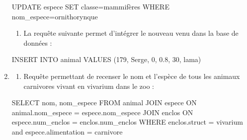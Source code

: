 \documentclass[
  letterpaper,
  DIV=11,
  numbers=noendperiod]{scrartcl}
\newenvironment{Shaded}{\begin{snugshade}}{\end{snugshade}}
\newcommand{\DecValTok}[1]{\textcolor[rgb]{0.68,0.00,0.00}{#1}}
\newcommand{\FloatTok}[1]{\textcolor[rgb]{0.68,0.00,0.00}{#1}}
\newcommand{\KeywordTok}[1]{\textcolor[rgb]{0.00,0.23,0.31}{#1}}
\newcommand{\NormalTok}[1]{\textcolor[rgb]{0.00,0.23,0.31}{#1}}
\newcommand{\OperatorTok}[1]{\textcolor[rgb]{0.37,0.37,0.37}{#1}}
\newcommand{\StringTok}[1]{\textcolor[rgb]{0.13,0.47,0.30}{#1}}
\providecommand{\tightlist}{%
  \setlength{\itemsep}{0pt}\setlength{\parskip}{0pt}}\usepackage{longtable,booktabs,array}
\begin{document}
\begin{enumerate}
\begin{Shaded}
\begin{Highlighting}[]
\KeywordTok{UPDATE}\NormalTok{ espece}
\KeywordTok{SET}\NormalTok{ classe}\OperatorTok{=}\StringTok{\textquotesingle{}mammifères\textquotesingle{}}
\KeywordTok{WHERE}\NormalTok{ nom\_espece}\OperatorTok{=}\StringTok{\textquotesingle{}ornithorynque\textquotesingle{}}
\end{Highlighting}
\end{Shaded}

  \begin{enumerate}
  \def\labelenumii{\alph{enumii}.}
  \setcounter{enumii}{1}
  \tightlist
  \item
    La requête suivante permet d'intégrer le nouveau venu dans la base
    de données :
  \end{enumerate}

\begin{Shaded}
\begin{Highlighting}[]
\KeywordTok{INSERT} \KeywordTok{INTO}\NormalTok{ animal }\KeywordTok{VALUES}\NormalTok{ (}\DecValTok{179}\NormalTok{, }\StringTok{\textquotesingle{}Serge\textquotesingle{}}\NormalTok{, }\DecValTok{0}\NormalTok{, }\FloatTok{0.8}\NormalTok{, }\DecValTok{30}\NormalTok{, }\StringTok{\textquotesingle{}lama\textquotesingle{}}\NormalTok{)}
\end{Highlighting}
\end{Shaded}
\item
  \begin{enumerate}
  \def\labelenumii{\alph{enumii}.}
  \tightlist
  \item
    Requête permettant de recenser le nom et l'espèce de tous les
    animaux carnivores vivant en vivarium dans le zoo :
  \end{enumerate}

\begin{Shaded}
\begin{Highlighting}[]
\KeywordTok{SELECT}\NormalTok{ nom, nom\_espece}
\KeywordTok{FROM}\NormalTok{ animal}
\KeywordTok{JOIN}\NormalTok{ espece }\KeywordTok{ON}\NormalTok{ animal.nom\_espece }\OperatorTok{=}\NormalTok{ espece.nom\_espece}
\KeywordTok{JOIN}\NormalTok{ enclos }\KeywordTok{ON}\NormalTok{ espece.num\_enclos }\OperatorTok{=}\NormalTok{ enclos.num\_enclos}
\KeywordTok{WHERE}\NormalTok{ enclos.struct }\OperatorTok{=} \StringTok{\textquotesingle{}vivarium\textquotesingle{}} \KeywordTok{and}\NormalTok{ espece.alimentation }\OperatorTok{=} \StringTok{\textquotesingle{}carnivore\textquotesingle{}}
\end{Highlighting}
\end{Shaded}


\end{enumerate}
\end{document}
